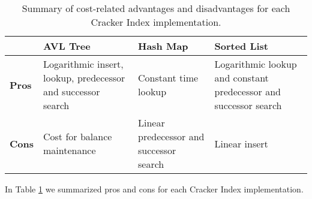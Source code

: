 \begin{table}
\begin{tabular}{| m{2em}  | m{2cm} | m{2cm}|  m{2cm} |} 
\hline
 & \textbf{AVL Tree}& \textbf{Hash Map}&\textbf{Sorted List} \\ 
\hline
\textbf{Pros} & Logarithmic insert, lookup, predecessor and successor search & Constant time lookup & Logarithmic lookup and constant predecessor and successor search \\
\hline
\textbf{Cons} & Cost for balance maintenance & Linear predecessor and successor search & Linear insert \\
\hline
\end{tabular}
\caption{Summary of cost-related advantages and disadvantages for each Cracker Index implementation.}
\label{table:implementations}
\end{table}

In Table \ref{table:implementations} we summarized pros and cons for each Cracker Index implementation.
